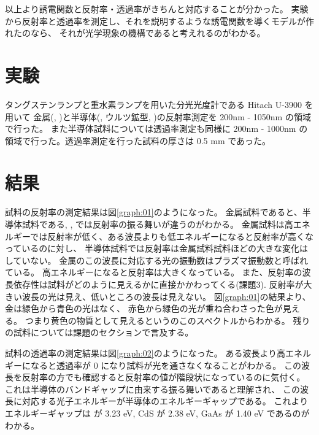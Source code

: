 \documentclass[11pt,dvipdfmx,a4paper]{jsarticle}
\begin{document}
以上より誘電関数と反射率・透過率がきちんと対応することが分かった。
実験から反射率と透過率を測定し、それを説明するような誘電関数を導くモデルが作れたのなら、
それが光学現象の機構であると考えれるのがわかる。

\section{実験}
タングステンランプと重水素ランプを用いた分光光度計である Hitach U-3900 を用いて
金属(, )と半導体(, ウルツ鉱型, )の反射率測定を 200nm - 1050nm の領域で行った。
また半導体試料については透過率測定も同様に 200nm - 1000nm の領域で行った。透過率測定を行った試料の厚さは 0.5 mm であった。

\section{結果}
試料の反射率の測定結果は図\ref{graph:01}のようになった。
金属試料であると、半導体試料である, ,  では反射率の振る舞いが違うのがわかる。
金属試料は高エネルギーでは反射率が低く、ある波長よりも低エネルギーになると反射率が高くなっているのに対し、
半導体試料では反射率は金属試料試料ほどの大きな変化はしていない。
金属のこの波長に対応する光の振動数はプラズマ振動数と呼ばれている。
高エネルギーになると反射率は大きくなっている。
また、反射率の波長依存性は試料がどのように見えるかに直接かかわってくる(課題3).
反射率が大きい波長の光は見え、低いところの波長は見えない。
図\ref{graph:01}の結果より、金は緑色から青色の光はなく、
赤色から緑色の光が重ね合わさった色が見える。
つまり黄色の物質として見えるというのこのスペクトルからわかる。
残りの試料については課題のセクションで言及する。

試料の透過率の測定結果は図\ref{graph:02}のようになった。
ある波長より高エネルギーになると透過率が 0 になり試料が光を通さなくなることがわかる。
この波長を反射率の方でも確認すると反射率の値が階段状になっているのに気付く。
これは半導体のバンドギャップに由来する振る舞いであると理解され、
この波長に対応する光子エネルギーが半導体のエネルギーギャップである。
これよりエネルギーギャップは  が 3.23 eV, CdS が 2.38 eV, GaAs が 1.40 eV であるのがわかる。
\end{document}
